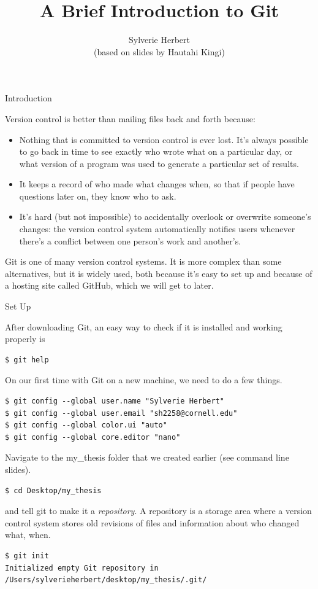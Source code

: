 \documentclass[10pt]{beamer}
\begin{document}
\title{A Brief Introduction to Git}
\author{Sylverie Herbert \\ (based on slides by Hautahi Kingi)}
\date{}


\maketitle

\begin{frame}{Introduction}


Version control is better than mailing files back and forth because:
\begin{itemize}
\item
Nothing that is committed to version control is ever lost. It's always possible to go back in time to see exactly who wrote what on a particular day, or what version of a program was used to generate a particular set of results.
\item
It keeps a record of who made what changes when, so that if people have questions later on, they know who to ask.
\item
It's hard (but not impossible) to accidentally overlook or overwrite someone's changes: the version control system automatically notifies users whenever there's a conflict between one person's work and another's.
\end{itemize}
Git is one of many version control systems. It is more complex than some alternatives, but it is widely used, both because it's easy to set up and because of a hosting site called GitHub, which we will get to later.

\end{frame}

\begin{frame}[fragile]{Set Up}

After downloading Git, an easy way to check if it is installed and working properly is
\begin{lstlisting}
$ git help
\end{lstlisting}
On our first time with Git on a new machine, we need to do a few things.
\begin{lstlisting}
$ git config --global user.name "Sylverie Herbert"
$ git config --global user.email "sh2258@cornell.edu"
$ git config --global color.ui "auto"
$ git config --global core.editor "nano"
\end{lstlisting}
Navigate to the my\_thesis folder that we created earlier (see command line slides).
\begin{lstlisting}
$ cd Desktop/my_thesis
\end{lstlisting}
and tell git to make it a \emph{repository}. A repository is a storage area where a version control system stores old revisions of files and information about who changed what, when.
\begin{lstlisting}
$ git init
Initialized empty Git repository in /Users/sylverieherbert/desktop/my_thesis/.git/
\end{lstlisting}

\end{frame}
\end{document}
